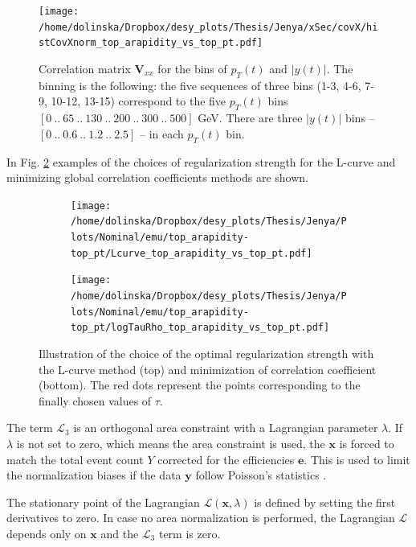 \begin{figure}[t]
  \centering
  \texttt{[image: /home/dolinska/Dropbox/desy\_plots/Thesis/Jenya/xSec/covX/histCovXnorm\_top\_arapidity\_vs\_top\_pt.pdf]}
  \caption{Correlation matrix $\mathbf{V}_{xx}$ for the bins of $p_{T}(t)$ and $|y(t)|$. The binning is the following:
  the five sequences of three bins (1-3, 4-6, 7-9, 10-12, 13-15) correspond to the five $p_{T}(t)$ bins $[0\:..\:65\:..\:130\:..\:200\:..\:300\:..\:500]$ GeV.
          There are three $|y(t)|$ bins -- $[0\:..\:0.6\:..\:1.2\:..\:2.5]$ -- in each $p_{T}(t)$ bin.}
  \label{fig:corr_matr}
\end{figure}

In Fig. \ref{fig:reg_s_m} examples of the choices of regularization strength for the L-curve and minimizing global correlation coefficients 
methods are shown.

\begin{figure}[p]
\centering
\begin{subfigure}
  \centering
  \texttt{[image: /home/dolinska/Dropbox/desy\_plots/Thesis/Jenya/Plots/Nominal/emu/top\_arapidity-top\_pt/Lcurve\_top\_arapidity\_vs\_top\_pt.pdf]}
\end{subfigure}
\begin{subfigure}
  \centering
  \texttt{[image: /home/dolinska/Dropbox/desy\_plots/Thesis/Jenya/Plots/Nominal/emu/top\_arapidity-top\_pt/logTauRho\_top\_arapidity\_vs\_top\_pt.pdf]}
\end{subfigure}
\caption{Illustration of the choice of the optimal regularization strength with the L-curve method (top) and minimization of correlation coefficient
         (bottom). The red dots represent the points corresponding to the finally chosen values of $\tau$.}
\label{fig:reg_s_m}
\end{figure}

The term $\mathcal{L}_{3}$ is an orthogonal area constraint with a Lagrangian parameter $\lambda$. If $\lambda$ is not set to zero,
which means the area constraint is used, the $\mathbf{x}$ is forced to match the total event count $Y$ corrected for the efficiencies $\mathbf{e}$.
This is used to limit the normalization biases if the data $\mathbf{y}$ follow Poisson's statistics \cite{Cowan98}.

The stationary point of the Lagrangian $\mathcal{L}(\mathbf{x}, \lambda)$ is defined by setting the first derivatives to zero. In case no 
area normalization is performed, the Lagrangian $\mathcal{L}$ depends only on $\mathbf{x}$ and the $\mathcal{L}_{3}$ term is zero.

